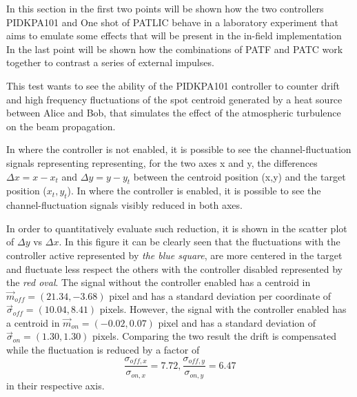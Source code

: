 
In this section in the first two points will be shown how the two controllers PIDKPA101 and One shot of PATLIC behave in a laboratory experiment that aims to emulate some effects that will be present in the in-field implementation
In the last point will be shown how the combinations of PATF and PATC work together to contrast a series of external impulses.

This test wants to see the ability of the PIDKPA101 controller to counter drift and high frequency fluctuations of the spot centroid generated by a heat source between Alice and Bob, that simulates the effect of the atmospheric turbulence on
the beam propagation.

In  where the controller is not enabled, it is possible to see the channel-fluctuation signals representing representing, for the two axes x and y, the differences $\Delta x = x - x_t$ and $\Delta y = y - y_t$ between the centroid position (x,y) and the target position ($x_t, y_t$).
In  where the controller is enabled, it is possible to see the channel-fluctuation signals visibly reduced in both axes.

In order to quantitatively evaluate such reduction, it is shown in  the scatter plot of $\Delta y$ vs $\Delta x$. In this figure it can be clearly seen that the fluctuations with the controller active represented by \textit{the blue square}, are more centered in the target and fluctuate less respect the others with the controller disabled represented by the \textit{red oval}.
The signal without the controller enabled has a centroid in $\vec{m}_{off} = (21.34, -3.68)$ pixel and has a standard deviation per coordinate of $\vec{\sigma}_{off} = (10.04, 8.41)$ pixels. However, the signal with the controller enabled has a centroid in $\vec{m}_{on} = (-0.02,0.07)$ pixel and has a standard deviation of $\vec{\sigma}_{on} = (1.30, 1.30)$ pixels. Comparing the two result the drift is compensated while the fluctuation is reduced by a factor of
\begin{equation}
  \frac{\sigma_{off, x}}{\sigma_{on, x}} = 7.72, \frac{\sigma_{off, y}}{\sigma_{on, y}} = 6.47
\end{equation}
in their respective axis.


